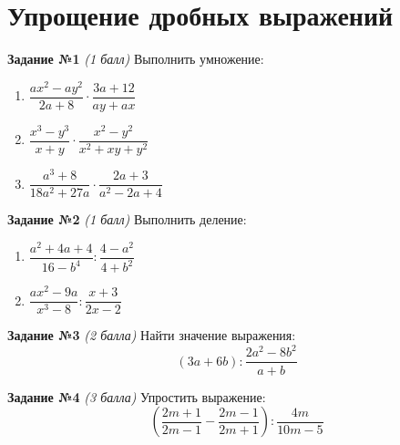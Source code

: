 \documentclass[12pt, a5paper]{article}
\begin{document}
		

\section*{Упрощение дробных выражений}
\textbf{Задание №1} \textit{(1 балл)} Выполнить умножение:
\begin{enumerate}[label=\asbuk*)]
	\item $\dfrac{ax^2-ay^2}{2a+8}\cdot\dfrac{3a+12}{ay+ax}$
	\item $\dfrac{x^3-y^3}{x+y}\cdot\dfrac{x^2-y^2}{x^2+xy+y^2}$
	\item $\dfrac{a^3+8}{18a^2+27a}\cdot\dfrac{2a+3}{a^2-2a+4}$
\end{enumerate}

\textbf{Задание №2} \textit{(1 балл)} Выполнить деление:
\begin{enumerate}[label=\asbuk*)]
	\item $\dfrac{a^2+4a+4}{16-b^4}:\dfrac{4-a^2}{4+b^2}$
	\item $\dfrac{ax^2-9a}{x^3-8}:\dfrac{x+3}{2x-2}$
\end{enumerate}

\textbf{Задание №3} \textit{(2 балла)} Найти значение выражения: $$(3a+6b):\dfrac{2a^2-8b^2}{a+b}$$

\textbf{Задание №4} \textit{(3 балла)} Упростить выражение: $$\left(\dfrac{2m+1}{2m-1}-\dfrac{2m-1}{2m+1}\right):\dfrac{4m}{10m-5}$$
\end{document}
